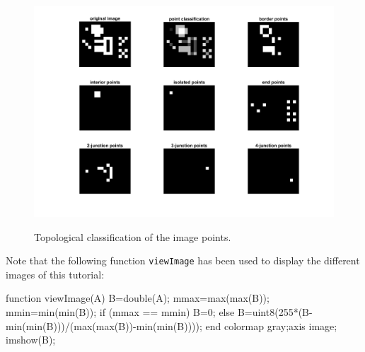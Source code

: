 \begin{figure}[htbp]
 \centering
 \includegraphics[width=\textwidth]{imageClassification.png}\label{fig:topological_description:matlab:imageClassification}
 \caption{Topological classification of the image points.}
\end{figure}

\noindent Note that the following function \texttt{viewImage} has been used to display the different images of this tutorial:
\begin{matlab}
function viewImage(A)
B=double(A);
mmax=max(max(B));
mmin=min(min(B));
if (mmax == mmin) B=0;
else B=uint8(255*(B-min(min(B)))/(max(max(B))-min(min(B))));
end
colormap gray;axis image;
imshow(B);
\end{matlab}
